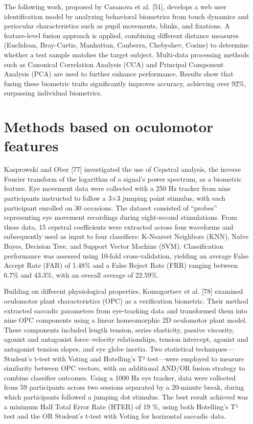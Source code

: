 \documentclass[12pt]{report}
\begin{document}
The following work, proposed by Casanova et al. [51], develops a web user identification model by analyzing behavioral biometrics from touch dynamics and periocular characteristics such as pupil movements, blinks, and fixations.
A feature-level fusion approach is applied, combining different distance measures (Euclidean, Bray-Curtis, Manhattan, Canberra, Chebyshev, Cosine) to determine whether a test sample matches the target subject.
Multi-data processing methods such as Canonical Correlation Analysis (CCA) and Principal Component Analysis (PCA) are used to further enhance performance.
Results show that fusing these biometric traits significantly improves accuracy, achieving over 92\%, surpassing individual biometrics.

\section{Methods based on oculomotor features}

Kasprowski and Ober [77] investigated the use of Cepstral analysis, the inverse Fourier transform of the logarithm of a signal's power spectrum, as a biometric feature.
Eye movement data were collected with a 250 Hz tracker from nine participants instructed to follow a 3×3 jumping point stimulus, with each participant enrolled on 30 occasions. 
The dataset consisted of “probes” representing eye movement recordings during eight-second stimulations. 
From these data, 15 cepstral coefficients were extracted across four waveforms and subsequently used as input to four classifiers: K-Nearest Neighbors (KNN), Naïve Bayes, Decision Tree, and Support Vector Machine (SVM). 
Classification performance was assessed using 10-fold cross-validation, yielding an average False Accept Rate (FAR) of 1.48\% and a False Reject Rate (FRR) ranging between 6.7\% and 43.3\%, with an overall average of 22.59\%.

Building on different physiological properties, Komogortsev et al. [78] examined oculomotor plant characteristics (OPC) as a verification biometric. 
Their method extracted saccadic parameters from eye-tracking data and transformed them into nine OPC components using a linear homeomorphic 2D oculomotor plant model. 
These components included length tension, series elasticity, passive viscosity, agonist and antagonist force–velocity relationships, tension intercept, agonist and antagonist tension slopes, and eye globe inertia. 
Two statistical techniques—Student's t-test with Voting and Hotelling's T² test—were employed to measure similarity between OPC vectors, with an additional AND/OR fusion strategy to combine classifier outcomes. 
Using a 1000 Hz eye tracker, data were collected from 59 participants across two sessions separated by a 20-minute break, during which participants followed a jumping dot stimulus. 
The best result achieved was a minimum Half Total Error Rate (HTER) of 19 \%, using both Hotelling's T² test and the OR Student's t-test with Voting for horizontal saccadic data.
\end{document}
